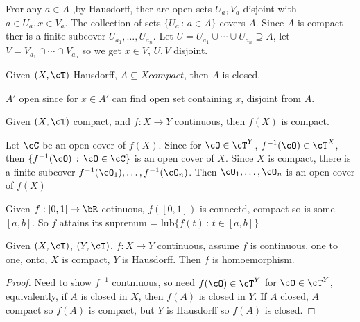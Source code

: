 \begin{pf}
    Fror any $a \in A$ ,by Hausdorff, ther are open sets $U_a, V_a$ disjoint with $a \in U_a, x \in V_a$. The collection of sets $\{U_a \, : \,  a \in A\}$ covers $A$. Since $A$ is compact ther is a finite subcover $U_{a_1}, \ldots, U_{a_n}$. Let $U= U_{a_1} \cup \cdots \cup U_{a_n} \supseteq A$, let $V = V_{a_1} \cap \cdots \cap V_{a_n}$ so we get $x \in V$, $U,V$ disjoint. 
\end{pf}

\begin{corollary}
    Given $(X, \cT)$ Hausdorff, $A \subseteq X compact$, then $A$ is closed. 
\end{corollary}

\begin{pf}
    $A'$ open since for $x \in A'$ can find open set containing $x$, disjoint from $A$. 
\end{pf}

\begin{theorem}
    Given $(X, \cT)$ compact, and $f: X \to Y$ continuous, then $f(X)$ is compact. 
\end{theorem}

\begin{pf}
    Let $\cC$ be an open cover of $f(X)$. Since for $\cO \in \cT^Y$, $f^{-1}(\cO) \in \cT^X$, then $\{f^{-1}(\cO)\, : \, \cO \in \cC\}$ is an open cover of $X$. Since $X$ is compact, there is a finite subcover $f^{-1}(\cO_1), \ldots, f^{-1}(\cO_n)$. Then $\cO_1, \ldots, \cO_n$ is an open cover of $f(X)$ 
 \end{pf}

 \begin{example}
    Given $f: [0,1] \to \bR$ cotinuous, $f([0,1])$ is connectd, compact so is some $[a,b]$. So $f$ attains its suprenum = lub$\{f(t) \, : \, t \in [a,b]\}$ 
 \end{example}

 \begin{theorem}
    Given $(X, \cT)$, $(Y, \cT)$, $f: X \to Y$ continuous, assume $f$ is continuous, one to one, onto, $X$ is compact, $Y$ is Hausdorff. Then $f$ is homoemorphism. 
 \end{theorem}

 \begin{proof}
    Need to show $f^{-1}$ contniuous, so need $f(\cO) \in \cT^Y$ for $\cO \in \cT^Y$, equivalently, if $A$ is closed in $X$, then $f(A)$ is closed in $Y$. If $A$ closed, $A$ compact so $f(A)$ is compact, but $Y$ is Hausdorff so $f(A)$ is closed. 
 \end{proof}